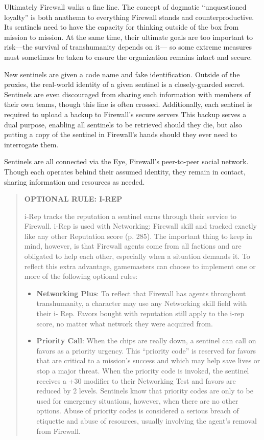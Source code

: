 Ultimately Firewall walks a fine line. The concept 
of dogmatic ``unquestioned loyalty'' is both anathema 
to everything Firewall stands and counterproductive. 
Its sentinels need to have the capacity for thinking 
outside of the box from mission to mission. At the 
same time, their ultimate goals are too important to 
risk—the survival of transhumanity depends on it—
so some extreme measures must sometimes be taken 
to ensure the organization remains intact and secure.

New sentinels are given a code name and fake 
identification. Outside of the proxies, the real-world 
identity of a given sentinel is a closely-guarded secret. 
Sentinels are even discouraged from sharing such information
with members of their own teams, though
this line is often crossed. Additionally, each sentinel is 
required to upload a backup to Firewall's secure servers
This backup serves a dual purpose, enabling all
sentinels to be retrieved should they die, but also putting
a copy of the sentinel in Firewall's hands should
they ever need to interrogate them.

Sentinels are all connected via the Eye, Firewall's 
peer-to-peer social network. Though each operates 
behind their assumed identity, they remain in contact, 
sharing information and resources as needed. 

\begin{quotation}
\textbf{OPTIONAL RULE: I-REP}

i-Rep tracks the reputation a sentinel earns through
their service to Firewall. i-Rep is used with Networking:
Firewall skill and tracked exactly like any other
Reputation score (p. 285). The important thing to
keep in mind, however, is that Firewall agents come
from all factions and are obligated to help each other,
especially when a situation demands it. To reflect this
extra advantage, gamemasters can choose to implement
one or more of the following optional rules:
\begin{itemize}
\item \textbf{Networking Plus}: To reflect that Firewall has
agents throughout transhumanity, a character
may use any Networking skill field with their i-
Rep. Favors bought with reputation still apply
to the i-rep score, no matter what network they
were acquired from.
\item \textbf{Priority Call}: When the chips are really down, a
sentinel can call on favors as a priority urgency.
This “priority code” is reserved for favors that
are critical to a mission’s success and which may
help save lives or stop a major threat. When the
priority code is invoked, the sentinel receives a
+30 modifier to their Networking Test and favors
are reduced by 2 levels. Sentinels know that priority
codes are only to be used for emergency
situations, however, when there are no other
options. Abuse of priority codes is considered
a serious breach of etiquette and abuse of resources,
usually involving the agent’s removal
from Firewall.
\end{itemize}
\end{quotation}


